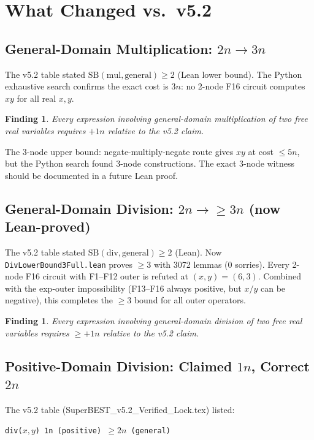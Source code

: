 \documentclass[11pt]{article}
\newtheorem{finding}[theorem]{Finding}
\begin{document}
\section{What Changed vs.\ v5.2}

\subsection{General-Domain Multiplication: $2n \to 3n$}

The v5.2 table stated $\mathrm{SB}(\mathrm{mul},\text{general}) \geq 2$ (Lean lower bound).
The Python exhaustive search confirms the exact cost is $3n$:
no 2-node F16 circuit computes $xy$ for all real $x,y$.

\begin{finding}
Every expression involving general-domain multiplication of two free real variables
requires $+1n$ relative to the v5.2 claim.
\end{finding}

\noindent The 3-node upper bound: negate-multiply-negate route gives $xy$ at cost $\leq 5n$,
but the Python search found 3-node constructions. The exact 3-node witness should be
documented in a future Lean proof.

\subsection{General-Domain Division: $2n \to \geq 3n$ (now Lean-proved)}

The v5.2 table stated $\mathrm{SB}(\mathrm{div},\text{general}) \geq 2$ (Lean).
Now \texttt{DivLowerBound3Full.lean} proves $\geq 3$ with 3072 lemmas (0 sorries).
Every 2-node F16 circuit with F1--F12 outer is refuted at $(x,y) = (6,3)$.
Combined with the exp-outer impossibility (F13--F16 always positive, but $x/y$ can be negative),
this completes the $\geq 3$ bound for all outer operators.

\begin{finding}
Every expression involving general-domain division of two free real variables
requires $\geq +1n$ relative to the v5.2 claim.
\end{finding}

\subsection{Positive-Domain Division: Claimed $1n$, Correct $2n$}

The v5.2 table (SuperBEST\_v5.2\_Verified\_Lock.tex) listed:
\begin{center}
\texttt{div($x,y$) \quad 1n (positive) \quad $\geq 2n$ (general)}
\end{center}
\end{document}
